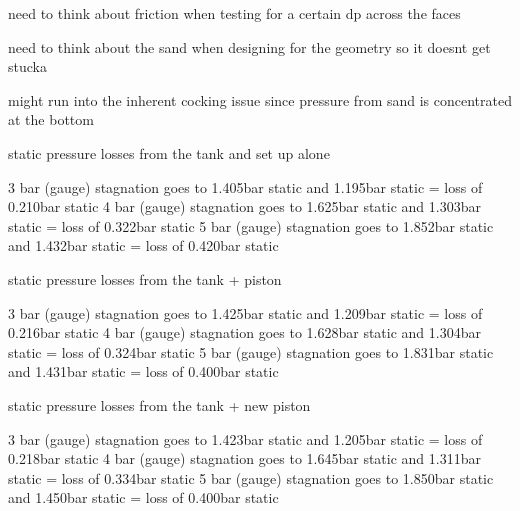 need to think about friction when testing for a certain dp across the faces

need to think about the sand when designing for the geometry so it doesnt get stucka

might run into the inherent cocking issue since pressure from sand is concentrated at the bottom

static pressure losses from the tank and set up alone

3 bar (gauge) stagnation goes to 1.405bar static and 1.195bar static = loss of 0.210bar static
4 bar (gauge) stagnation goes to 1.625bar static and 1.303bar static = loss of 0.322bar static
5 bar (gauge) stagnation goes to 1.852bar static and 1.432bar static = loss of 0.420bar static

static pressure losses from the tank + piston

3 bar (gauge) stagnation goes to 1.425bar static and 1.209bar static = loss of 0.216bar static
4 bar (gauge) stagnation goes to 1.628bar static and 1.304bar static = loss of 0.324bar static
5 bar (gauge) stagnation goes to 1.831bar static and 1.431bar static = loss of 0.400bar static

static pressure losses from the tank + new piston

3 bar (gauge) stagnation goes to 1.423bar static and 1.205bar static = loss of 0.218bar static
4 bar (gauge) stagnation goes to 1.645bar static and 1.311bar static = loss of 0.334bar static
5 bar (gauge) stagnation goes to 1.850bar static and 1.450bar static = loss of 0.400bar static

